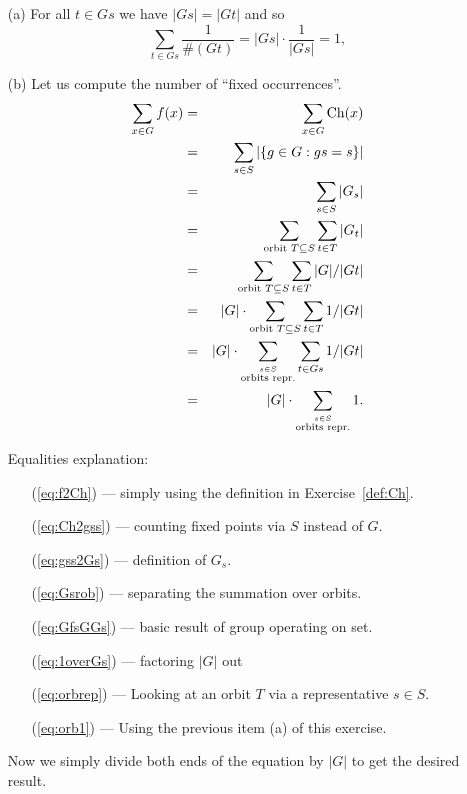 \documentclass[12pt]{book}
\def\Ch{\mathop{\rm Ch}\nolimits}
\newcounter{myenumi}
\newenvironment{myenumerate}
{\begin{enumerate}
 \setcounter{enumi}{\themyenumi}
}
{\setcounter{myenumi}{\theenumi}
 \end{enumerate}}
\begin{document}
\begin{myenumerate}
\begin{itemize}
 \item[(a)]
   For all \(t \in Gs\) we have \(|Gs|=|Gt|\) and so
   \begin{equation}
   \sum_{t \in Gs} {\frac{1}{\#(Gt)}} =
   |Gs|\cdot{\frac{1}{|Gs|}} = 1,
   \end{equation}
 \item[(b)]
  Let us compute the number of ``fixed occurrences''.
  \begin{eqnarray}
   \sum_{x\in G} f(x)
     & = & \sum_{x\in G} \Ch(x)                 \label{eq:f2Ch} \\
     & = & \sum_{s\in S} |\{g\in G: gs = s\}|    \label{eq:Ch2gss} \\
     & = & \sum_{s\in S} |G_s|                   \label{eq:gss2Gs} \\
     & = & \sum_{\textrm{orbit\ } T\subseteq S}
             \sum_{t\in T} |G_t|                 \label{eq:Gsrob} \\
     & = & \sum_{\textrm{orbit\ } T\subseteq S}
             \sum_{t\in T} |G|/|Gt|              \label{eq:GfsGGs} \\
     & = & |G|\cdot\sum_{\textrm{orbit\ } T\subseteq S}
             \sum_{t\in T} 1/|Gt|                \label{eq:1overGs} \\
     & = & |G|\cdot\sum_{\overset{s\in S}{\textrm{orbits repr.}}}
             \sum_{t\in Gs} 1/|Gt|                \label{eq:orbrep} \\
     & = & |G|\cdot\sum_{\overset{s\in S}{\textrm{orbits repr.}}} 1.
                                                  \label{eq:orb1}
  \end{eqnarray}

  Equalities explanation:
  \begin{itemize}
   \item[(\ref{eq:f2Ch})] --- simply using the definition
                              in Exercise~\ref{def:Ch}.
   \item[(\ref{eq:Ch2gss})] --- counting fixed points via $S$ instead of $G$.
   \item[(\ref{eq:gss2Gs})] --- definition of \(G_s\).
   \item[(\ref{eq:Gsrob})] --- separating the summation over orbits.
   \item[(\ref{eq:GfsGGs})] --- basic result of group operating on set.
   \item[(\ref{eq:1overGs})] --- factoring \(|G|\) out
   \item[(\ref{eq:orbrep})] ---  Looking at an orbit $T$ via
                                 a representative \(s\in S\).
   \item[(\ref{eq:orb1})] --- Using the previous item (a) of this exercise.
  \end{itemize}

  Now we simply divide both ends of the equation by \(|G|\)
  to get the desired result.

\end{itemize}

\end{myenumerate}
\end{document}
